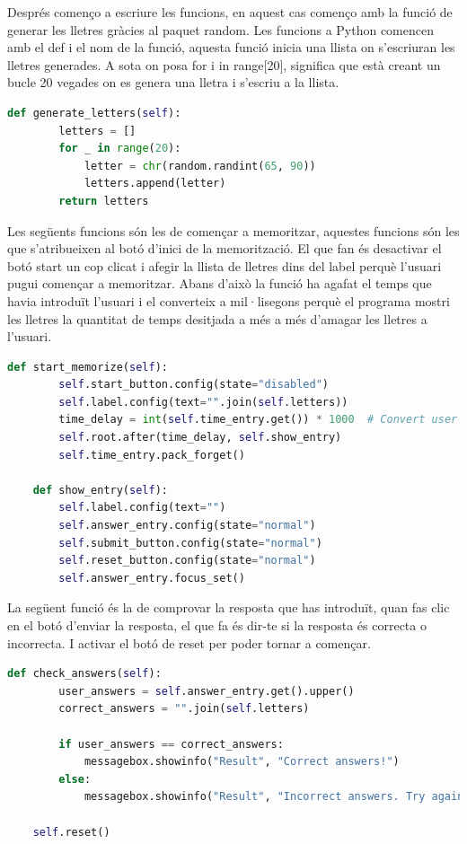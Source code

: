 Després començo a escriure les funcions, en aquest cas començo amb la funció de generar les lletres gràcies al paquet random. Les funcions a Python comencen amb el def i el nom de la funció, aquesta funció inicia una llista on s'escriuran les lletres generades. A sota on posa for i in range[20], significa que està creant un bucle 20 vegades on es genera una lletra i s'escriu a la llista.

\begin{lstlisting}[language=Python, style=colorEX, caption=Funció per generar lletres]
    def generate_letters(self):
        letters = []
        for _ in range(20):
            letter = chr(random.randint(65, 90))
            letters.append(letter)
        return letters
\end{lstlisting}

Les següents funcions són les de començar a memoritzar, aquestes funcions són les que s'atribueixen al botó d'inici de la memorització. El que fan és desactivar el botó start un cop clicat i
afegir la llista de lletres dins del label perquè l'usuari pugui començar a memoritzar. Abans d'això la funció ha agafat el temps que havia introduït l'usuari i el converteix a mil·lisegons perquè
el programa mostri les lletres la quantitat de temps desitjada a més a més d'amagar les lletres
a l'usuari.

\begin{lstlisting}[language=Python, style=colorEX, caption=Funcions pel botó d'inici]
    def start_memorize(self):
        self.start_button.config(state="disabled")
        self.label.config(text="".join(self.letters))
        time_delay = int(self.time_entry.get()) * 1000  # Convert user seconds to milliseconds
        self.root.after(time_delay, self.show_entry)
        self.time_entry.pack_forget()

    def show_entry(self):
        self.label.config(text="")
        self.answer_entry.config(state="normal")
        self.submit_button.config(state="normal")
        self.reset_button.config(state="normal")
        self.answer_entry.focus_set()
\end{lstlisting}

La següent funció és la de comprovar la resposta que has introduït, quan fas clic en el botó
d'enviar la resposta, el que fa és dir-te si la resposta és correcta o incorrecta. I activar el botó
de reset per poder tornar a començar.

\begin{lstlisting}[language=Python, style=colorEX, caption=Funció per comprovar la resposta]
    def check_answers(self):
        user_answers = self.answer_entry.get().upper()
        correct_answers = "".join(self.letters)

        if user_answers == correct_answers:
            messagebox.showinfo("Result", "Correct answers!")
        else:
            messagebox.showinfo("Result", "Incorrect answers. Try again.")

    self.reset()
\end{lstlisting}

